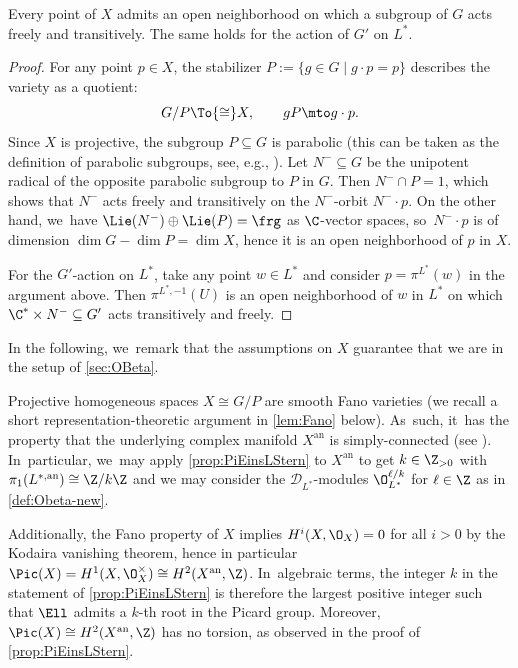 \begin{lem}\label{lem:transitCond}
Every point of $X$ admits an open neighborhood on which a subgroup of $G$ acts freely and transitively. The same holds for the action of $G'$ on $L^*$.
\end{lem}

\begin{proof}
For any point $p \in X$, the stabilizer $P := \{g \in G \mid g \cdot p = p\}$ describes the variety as a quotient:
\[
G/P \To{\cong} X, \qquad gP \mto g \cdot p.
\]
Since $X$ is projective, the subgroup $P \subseteq G$ is parabolic (this can be taken as the definition of parabolic subgroups, see, e.g., \cite[\S21.3]{Hum75}). Let $N^{-} \subseteq G$ be the unipotent radical of the opposite parabolic subgroup to $P$ in $G$. Then $N^{-} \cap P = 1$, which shows that $N^{-}$ acts freely and transitively on the $N^{-}$-orbit $N^{-} \cdot p$. On the other hand, we~have $\Lie(N^{-}) \oplus \Lie(P) = \frg$ as $\C$-vector spaces, so~$N^{-} \cdot p$ is of dimension $\dim G - \dim P = \dim X$, hence it is an open neighborhood of $p$ in $X$.

For the $G'$-action on $L^*$, take any point $w \in L^*$ and consider $p = \pi^{L^*}(w)$ in the argument above. Then $\pi^{L^*,-1}(U)$ is an open neighborhood of $w$ in $L^*$ on which $\C^* \times N^{-} \subseteq G'$ acts transitively and freely.
\end{proof}

In the following, we~remark that the assumptions on $X$ guarantee that we are in the setup of \cref{sec:OBeta}.

\begin{rmk}
Projective homogeneous spaces $X \cong G/P$ are smooth Fano varieties (we recall a short representation-theoretic argument in \cref{lem:Fano} below). As~such, it~has the property that the underlying complex manifold $X^{\mathrm{an}}$ is simply-connected (see \eg \cite[Cor.\,4.29]{Debarre-2001}). In~particular, we~may apply \cref{prop:PiEinsLStern} to $X^{\mathrm{an}}$ to get $k \in \Z_{>0}$ with $\pi_1(L^{*,\mathrm{an}}) \cong \Z/k\Z$ and we may consider the $\mathscr D_{L^*}$\nobreakdash-mod\-ules $\O_{L^*}^{\ell/k}$ for $\ell \in \Z$ as in \cref{def:Obeta-new}.

Additionally, the Fano property of $X$ implies $H^i(X,\O_X) = 0$ for all $i > 0$ by the Kodaira vanishing theorem, hence in particular $\Pic(X) = H^1(X,\O_X^\times) \cong H^2(X^{\mathrm{an}},\Z)$. In~algebraic terms, the integer $k$ in the statement of \cref{prop:PiEinsLStern} is therefore the largest positive integer such that $\Ell$ admits a $k$-th root in the Picard group. Moreover, $\Pic(X) \cong H^2(X^{\mathrm{an}},\Z)$ has no torsion, as observed in the proof of \cref{prop:PiEinsLStern}.
\end{rmk}

